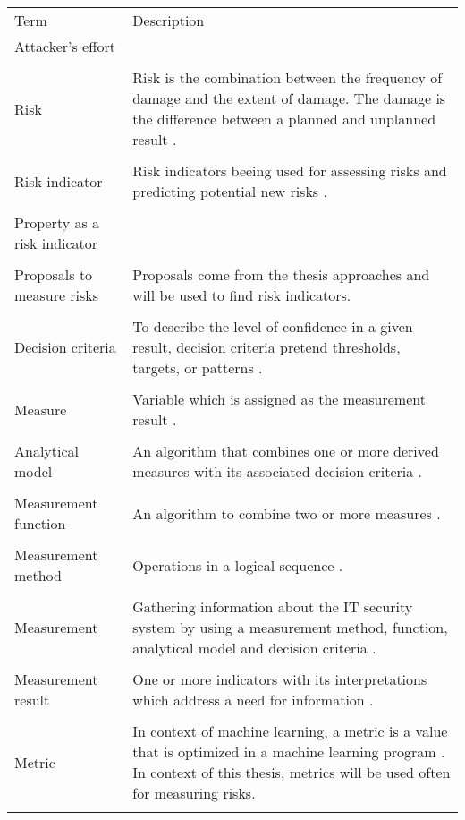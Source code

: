 \newpage

\begin{center}
  \begin{tabular}{ |L{4cm}|L{10cm}|  }
    \hline
     Term & Description \\ [0.5ex]
    Attacker's effort & \\
    & \\
    \hline
    Risk & Risk is the combination between the frequency of damage and
    the extent of damage. The damage is the difference between a
    planned and unplanned result \cite{bsi_glossar_2021}. \\
    & \\
    \hline
    Risk indicator & Risk indicators beeing used for assessing risks
    and predicting potential new risks \cite{Saluja2014RiskIF}. \\
    & \\
    \hline
    Property as a risk indicator & \\
    & \\
    \hline
    Proposals to measure risks & Proposals come from the thesis approaches and will be used to find risk indicators. \\
    & \\
    \hline
    Decision criteria & To describe the level of confidence in a given result, decision criteria pretend thresholds, targets, or patterns \cite{ISO_27004_2009}. \\
    & \\
    \hline
    Measure & Variable which is assigned as the measurement result \cite{ISO_27004_2009}. \\
    & \\
    \hline
    Analytical model & An algorithm that combines one or more derived measures with its associated decision criteria \cite{ISO_27004_2009}. \\
    & \\
    \hline
    Measurement function & An algorithm to combine two or more measures \cite{ISO_27004_2009}. \\
    & \\
    \hline
    Measurement method & Operations in a logical sequence \cite{ISO_27004_2009}. \\
    & \\
    \hline
    Measurement & Gathering information about the IT security system by using a measurement method, function, analytical model and decision criteria \cite{ISO_27004_2009}. \\
    & \\
    \hline
    Measurement result & One or more indicators with its interpretations which address a need for information \cite{ISO_27004_2009}. \\
    & \\
    \hline
    Metric & In context of machine learning, a metric is a value that is
    optimized  in a machine learning program \cite{google}.
    In context of this thesis, metrics will be used often for
    measuring risks. \\
    & \\
    \hline
  \end{tabular}
\end{center}

